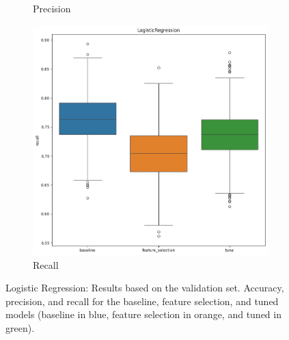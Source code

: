\documentclass[12pt]{article}
\begin{document}
\begin{figure}[H]
\begin{subfigure}{0.31\textwidth}
        \caption{Precision}
        \label{fig:logreg_prec}
    \end{subfigure}
    \begin{subfigure}{0.31\textwidth}
        \centering
        \includegraphics[width=\linewidth]{ims/logreg_recall.png}
        \caption{Recall}
        \label{fig:logreg_rec}
    \end{subfigure}
    \caption{Logistic Regression: Results based on the validation set. Accuracy,
    precision, and recall for the baseline, feature selection, and tuned models
    (baseline in blue, feature selection in orange, and tuned in green).}
    \label{fig:logreg}
\end{figure}
\end{document}
